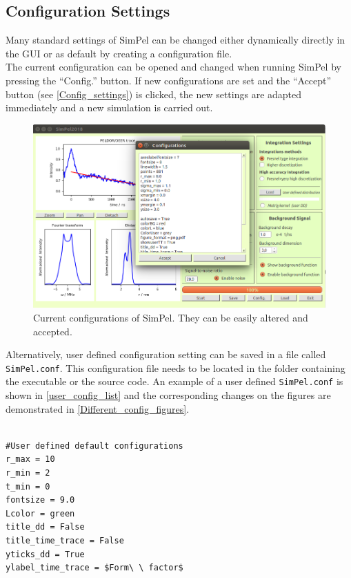 \documentclass[pdftex,bezier,german,a4,twoside, headexclude,12pt,nochapterprefix, titlepage]{extarticle}
\newcommand{\simpel}{\textsf{SimPel}}
\begin{document}
\subsection{Configuration Settings}
Many standard settings of \simpel{} can be changed either dynamically directly in the GUI or as default by creating a
configuration file.\\
The current configuration can be opened and changed when running  \simpel{} by pressing the ``Config.'' button.
If new configurations are set and the ``Accept'' button (see \autoref{Config_settings})
is clicked, the new settings are adapted immediately and a new simulation is carried out.
\begin{figure}[!htb]
\centering
\includegraphics[scale=0.5]{Config_example.png}
    \caption{Current configurations of  \simpel. They can be easily altered and accepted.}
   \label{Config_settings}
\end{figure}
Alternatively, user defined configuration setting can be saved in a file called \texttt{SimPel.conf}. This configuration file
needs to be located in the folder containing the executable or the source code. An example of a user defined \texttt{SimPel.conf} is
shown in \autoref{user_config_list} and the corresponding changes on the figures are demonstrated in \autoref{Different_config_figures}.
\newpage
\begin{lstlisting}[caption={Example for a user defined configuration file (\texttt{SimPel.conf}).},label = user_config_list]

#User defined default configurations 
r_max = 10
r_min = 2
t_min = 0
fontsize = 9.0
Lcolor = green
title_dd = False
title_time_trace = False
yticks_dd = True
ylabel_time_trace = $Form\ \ factor$
\end{lstlisting}
\end{document}
